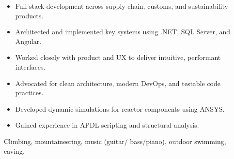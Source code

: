 \documentclass[10pt,a4paper,ragged2e,withhyper]{altacv}
\begin{document}
\begin{paracol}{2}
\switchcolumn


\begin{itemize}
  \item Full-stack development across supply chain, customs, and sustainability products.
  \item Architected and implemented key systems using .NET, SQL Server, and Angular.
  \item Worked closely with product and UX to deliver intuitive, performant interfaces.
  \item Advocated for clean architecture, modern DevOps, and testable code practices.
\end{itemize}

\divider

\begin{itemize}
  \item Developed dynamic simulations for reactor components using ANSYS.
  \item Gained experience in APDL scripting and structural analysis.
\end{itemize}




Climbing, mountaineering, music (guitar/ bass/piano), outdoor swimming, caving.

\end{paracol}
\end{document}
